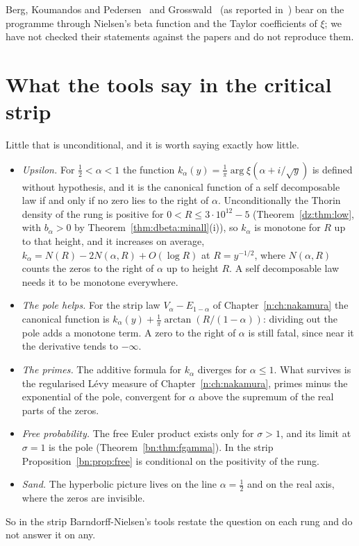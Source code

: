 Berg, Koumandos and Pedersen~\cite{BKP19} and Grosswald~\cite{Grosswald66} (as reported in~\cite{CNV86}) bear on the programme through Nielsen's beta function and the Taylor coefficients of $\xi$; we have not checked their statements against the papers and do not reproduce them.

\section{What the tools say in the critical strip}\label{bn:sec:strip}
Little that is unconditional, and it is worth saying exactly how little.
\begin{itemize}
\item \textit{Upsilon.} For $\frac12<\alpha<1$ the function $k_\alpha(y)=\frac1\pi\arg\xi(\alpha+i/\sqrt y)$ is defined without hypothesis, and it is the canonical function of a self decomposable law if and only if no zero lies to the right of $\alpha$. Unconditionally the Thorin density of the rung is positive for $0<R\le3\cdot10^{12}-5$ (Theorem~\ref{dz:thm:low}, with $b_\alpha>0$ by Theorem~\ref{thm:dbeta:minall}(i)), so $k_\alpha$ is monotone for $R$ up to that height, and it increases on average, $k_\alpha=N(R)-2N(\alpha,R)+O(\log R)$ at $R=y^{-1/2}$, where $N(\alpha,R)$ counts the zeros to the right of $\alpha$ up to height $R$. A self decomposable law needs it to be monotone everywhere.
\item \textit{The pole helps.} For the strip law $V_\alpha-E_{1-\alpha}$ of Chapter~\ref{n:ch:nakamura} the canonical function is $k_\alpha(y)+\frac1\pi\arctan(R/(1-\alpha))$: dividing out the pole adds a monotone term. A zero to the right of $\alpha$ is still fatal, since near it the derivative tends to $-\infty$.
\item \textit{The primes.} The additive formula for $k_\alpha$ diverges for $\alpha\le1$. What survives is the regularised L\'evy measure of Chapter~\ref{n:ch:nakamura}, primes minus the exponential of the pole, convergent for $\alpha$ above the supremum of the real parts of the zeros.
\item \textit{Free probability.} The free Euler product exists only for $\sigma>1$, and its limit at $\sigma=1$ is the pole (Theorem~\ref{bn:thm:fgamma}). In the strip Proposition~\ref{bn:prop:free} is conditional on the positivity of the rung.
\item \textit{Sand.} The hyperbolic picture lives on the line $\alpha=\frac12$ and on the real axis, where the zeros are invisible.
\end{itemize}
So in the strip Barndorff-Nielsen's tools restate the question on each rung and do not answer it on any.

